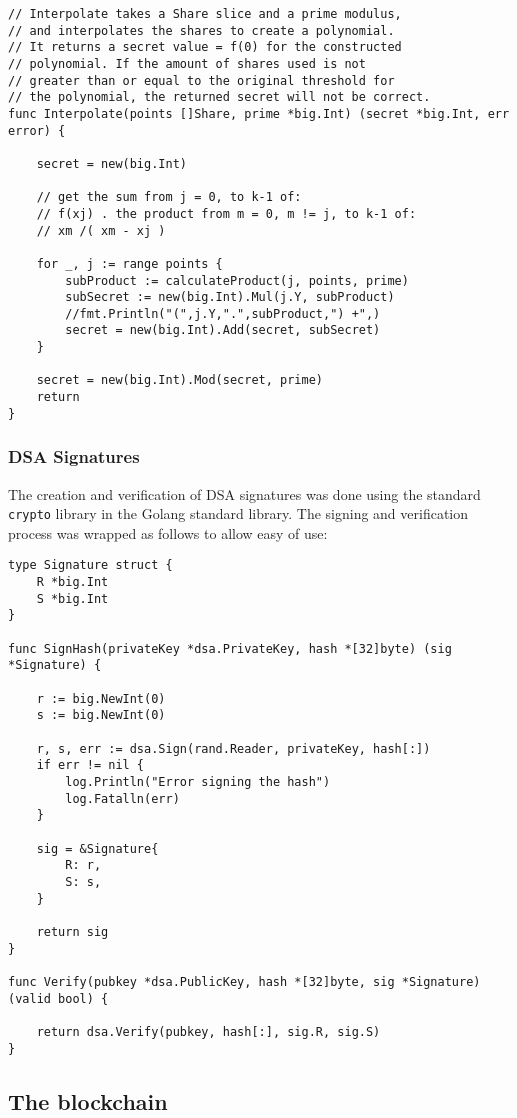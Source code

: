 \documentclass[a4paper,12pt]{article}
\begin{document}
\begin{Verbatim}[obeytabs,tabsize=4]
// Interpolate takes a Share slice and a prime modulus,
// and interpolates the shares to create a polynomial.
// It returns a secret value = f(0) for the constructed
// polynomial. If the amount of shares used is not
// greater than or equal to the original threshold for
// the polynomial, the returned secret will not be correct.
func Interpolate(points []Share, prime *big.Int) (secret *big.Int, err error) {

	secret = new(big.Int)

	// get the sum from j = 0, to k-1 of:
	// f(xj) . the product from m = 0, m != j, to k-1 of:
	// xm /( xm - xj )

	for _, j := range points {
		subProduct := calculateProduct(j, points, prime)
		subSecret := new(big.Int).Mul(j.Y, subProduct)
		//fmt.Println("(",j.Y,".",subProduct,") +",)
		secret = new(big.Int).Add(secret, subSecret)
	}

	secret = new(big.Int).Mod(secret, prime)
	return
}
\end{Verbatim}

\subsubsection{DSA Signatures}
The creation and verification of DSA signatures was done using the standard \verb|crypto| library in the Golang standard library. The signing and verification process was wrapped as follows to allow easy of use:

\begin{Verbatim}[obeytabs,tabsize=4]
type Signature struct {
	R *big.Int
	S *big.Int
}

func SignHash(privateKey *dsa.PrivateKey, hash *[32]byte) (sig *Signature) {

	r := big.NewInt(0)
	s := big.NewInt(0)

	r, s, err := dsa.Sign(rand.Reader, privateKey, hash[:])
	if err != nil {
		log.Println("Error signing the hash")
		log.Fatalln(err)
	}

	sig = &Signature{
		R: r,
		S: s,
	}

	return sig
}

func Verify(pubkey *dsa.PublicKey, hash *[32]byte, sig *Signature) (valid bool) {

	return dsa.Verify(pubkey, hash[:], sig.R, sig.S)
}
\end{Verbatim}

\subsection{The blockchain}
\end{document}
